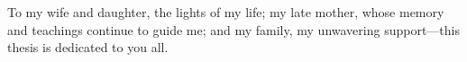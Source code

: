 \documentclass[main.tex]{subfiles}
\begin{document}
    \begin{dedication}
        To my wife and daughter, the lights of my life; my late mother, whose memory and teachings continue to guide me; and my family, my unwavering support---this thesis is dedicated to you all.
        \end{dedication}
\end{document}
